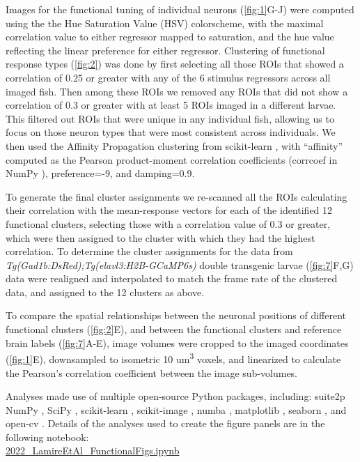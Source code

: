 \documentclass[9pt,lineno]{RandlettLab_elife}
\begin{document}
Images for the functional tuning of individual neurons (\autoref{fig:1}G-J) were computed using the the Hue Saturation Value (HSV) colorscheme, with the maximal correlation value to either regressor mapped to saturation, and the hue value reflecting the linear preference for either regressor. Clustering of functional response types (\autoref{fig:2}) was done by first selecting all those ROIs that showed a correlation of 0.25 or greater with any of the 6 stimulus regressors across all imaged fish. Then among these ROIs we removed any ROIs that did not show a correlation of 0.3 or greater with at least 5 ROIs imaged in a different larvae. This filtered out ROIs that were unique in any individual fish, allowing us to focus on those neuron types that were most consistent across individuals. We then used the Affinity Propagation clustering from scikit-learn \citep{Pedregosa2011-dj}, with “affinity” computed as the Pearson product-moment correlation coefficients (corrcoef in NumPy \citep{Harris2020-bg}), preference=-9, and damping=0.9. 

To generate the final cluster assignments we re-scanned all the ROIs calculating their correlation with the mean-response vectors for each of the identified 12 functional clusters, selecting those with a correlation value of 0.3 or greater, which were then assigned to the cluster with which they had the highest correlation. To determine the cluster assignments for the data from \emph{Tg(Gad1b:DsRed);Tg(elavl3:H2B-GCaMP6s)} double transgenic larvae (\autoref{fig:7}F,G) data were realigned and interpolated to match the frame rate of the clustered data, and assigned to the 12 clusters as above. 

To compare the spatial relationships between the neuronal positions of different functional clusters (\autoref{fig:2}E), and between the functional clusters and reference brain labels (\autoref{fig:7}A-E), image volumes were cropped to the imaged coordinates (\autoref{fig:1}E), downsampled to isometric 10 um\textsuperscript{3} voxels, and linearized to calculate the Pearson's correlation coefficient between the image sub-volumes. 

Analyses made use of multiple open-source Python packages, including:
suite2p \citep{Pachitariu2017-ad}
NumPy \citep{Harris2020-bg}, SciPy \citep{Virtanen2020-sz}, scikit-learn \citep{Pedregosa2011-dj}, scikit-image \citep{Van_der_Walt2014-hx}, numba \citep{Lam2015-pq}, matplotlib \citep{Hunter2007-ub}, seaborn \citep{Waskom2021-ah}, and open-cv \citep{Bradski2000-qo}.
 Details of the analyses used to create the figure panels are in the following notebook: 
 \\ \href{https://nbviewer.org/github/owenrandlett/lamire_2022/blob/main/2022_LamireEtAl_FunctionalFigs.ipynb}{2022\_LamireEtAl\_FunctionalFigs.ipynb}
\end{document}
